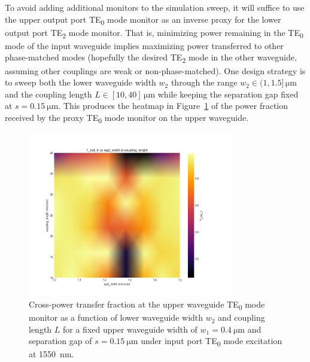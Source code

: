 \documentclass[10pt, a4paper]{article}
\begin{document}
To avoid adding additional monitors to the simulation sweep,
it will suffice to use the upper output port TE\textsubscript{0} mode monitor as an inverse proxy for the lower output port TE\textsubscript{2} mode monitor. That is, minimizing power remaining in the TE\textsubscript{0} mode of the input waveguide implies maximizing power transferred to other phase-matched modes (hopefully the desired TE\textsubscript{2} mode in the other waveguide, assuming other couplings are weak or non-phase-matched).
One design strategy is to sweep both the lower waveguide width \(w_2\) through the range \(w_2\in(1,1.5]\,\unit{\um}\) and the coupling length \(L\in[10,40]\,\unit{\um}\) while keeping the separation gap fixed at \(s=\SI{0.15}{\um}\).
This produces the heatmap in Figure~\ref{fig:te0_te2_coupling_heatmap} of the power fraction received by the proxy TE\textsubscript{0} mode monitor on the upper waveguide.
\begin{figure}[h!]
  \centering
  \includegraphics[width=0.8\textwidth]{task3/sweep_plots/sweep_idx_7_sweep__coupling_length=10_40_6_wg1_width=0.4_wg2_width=1_1.5_8_separation=0.15_center_wavelength=1.55_T_net_tr_heatmap.png}
  \caption{Cross-power transfer fraction at the upper waveguide TE\textsubscript{0} mode monitor as a function of lower waveguide width \(w_2\) and coupling length \(L\) for a fixed upper waveguide width of \(w_1=\SI{0.4}{\um}\) and separation gap of \(s=\SI{0.15}{\um}\) under input port TE\textsubscript{0} mode excitation at \SI{1550}{\nm}.}
  \label{fig:te0_te2_coupling_heatmap}
\end{figure}
\end{document}
